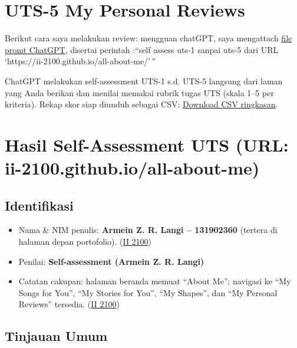 \documentclass[
  letterpaper,
  DIV=11,
  numbers=noendperiod]{scrreprt}
\providecommand{\tightlist}{%
  \setlength{\itemsep}{0pt}\setlength{\parskip}{0pt}}
\begin{document}

\chapter{UTS-5 My Personal Reviews}\label{uts-5-my-personal-reviews}

Berikut cara saya melakukan review: mengguan chatGPT, saya mengattach
\href{skor_uts.pdf}{file promt ChatGPT}, disertai perintah :``self
assess uts-1 sanpai uts-5 dari URL
`https://ii-2100.github.io/all-about-me/'\,''

ChatGPT melakukan self-assessment UTS-1 s.d. UTS-5 langsung dari laman
yang Anda berikan dan menilai memakai rubrik tugas UTS (skala 1--5 per
kriteria). Rekap skor siap diunduh sebagai CSV:
\href{sandbox:/mnt/data/UTS_self_assessment.csv}{Download CSV
ringkasan}.


\chapter{Hasil Self-Assessment UTS (URL:
ii-2100.github.io/all-about-me)}\label{hasil-self-assessment-uts-url-ii-2100.github.ioall-about-me}

\section{Identifikasi}\label{identifikasi}

\begin{itemize}
\tightlist
\item
  Nama \& NIM penulis: \textbf{Armein Z. R. Langi -- 131902360} (tertera
  di halaman depan portofolio).
  (\href{https://ii-2100.github.io/all-about-me/}{II 2100})
\item
  Penilai: \textbf{Self-assessment (Armein Z. R. Langi)}
\item
  Catatan cakupan: halaman beranda memuat ``About Me''; navigasi ke ``My
  Songs for You'', ``My Stories for You'', ``My Shapes'', dan ``My
  Personal Reviews'' tersedia.
  (\href{https://ii-2100.github.io/all-about-me/}{II 2100})
\end{itemize}

\section{Tinjauan Umum}\label{tinjauan-umum}
\end{document}
